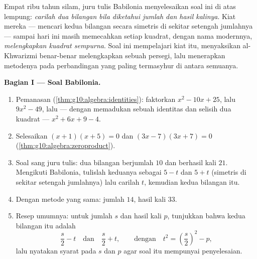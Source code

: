 \begin{problem}[{Soal akhir pekan --- soal jumlah-dan-hasil-kali,
melengkapkan kuadrat sempurna sebagaimana digambar al-Khwarizmi, dan
persamaan $x^2 = x + 1$}]
\label{pb:g10:algebra:1}
Empat ribu tahun silam, juru tulis Babilonia menyelesaikan soal ini di atas
lempung: \emph{carilah dua bilangan bila diketahui jumlah dan hasil kalinya}.
Kiat mereka --- mencari kedua bilangan secara simetris di sekitar
setengah jumlahnya --- sampai hari ini masih memecahkan setiap 
kuadrat, dengan nama modernnya, \emph{melengkapkan kuadrat sempurna}. Soal
ini mempelajari kiat itu, menyaksikan al-Khwarizmi benar-benar melengkapkan
sebuah persegi, lalu menerapkan metodenya pada perbandingan yang paling
termasyhur di antara semuanya.

\medskip
\noindent\textbf{Bagian I --- Soal Babilonia.}
\begin{enumerate}
  \item Pemanasan (\cref{thm:g10:algebra:identities}): faktorkan
        $x^2 - 10x + 25$, lalu $9x^2 - 49$, lalu --- dengan memadukan
        sebuah identitas dan selisih dua kuadrat ---
        $x^2 + 6x + 9 - 4$.
  \item Selesaikan $(x + 1)(x + 5) = 0$ dan
        $(3x - 7)(3x + 7) = 0$
        (\cref{thm:g10:algebra:zeroproduct}).
  \item Soal sang juru tulis: dua bilangan berjumlah $10$ dan
        berhasil kali $21$. Mengikuti Babilonia, tulislah keduanya sebagai
        $5 - t$ dan $5 + t$ (simetris di sekitar setengah jumlahnya) lalu
        carilah $t$, kemudian kedua bilangan itu.
  \item Dengan metode yang sama: jumlah $14$, hasil kali $33$.
  \item Resep umumnya: untuk jumlah $s$ dan hasil kali $p$, tunjukkan
        bahwa kedua bilangan itu adalah
        \[
        \frac s2 - t
        \quad\text{dan}\quad
        \frac s2 + t,
        \qquad\text{dengan}\quad
        t^2 = \left(\frac s2\right)^2 - p ,
        \]
        lalu nyatakan syarat pada $s$ dan $p$ agar soal itu
        mempunyai penyelesaian.
\end{enumerate}


\end{problem}

